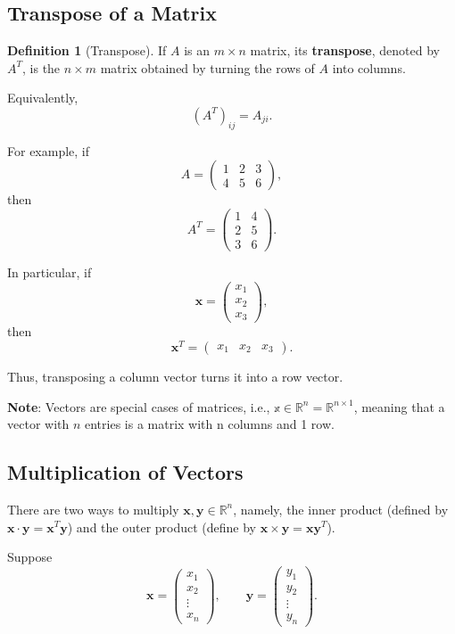 \documentclass[11pt]{article}
\theoremstyle{definition}
\newtheorem{definition}{Definition}
\theoremstyle{plain}
\theoremstyle{remark}
\begin{document}
\subsection*{Transpose of a Matrix}

\begin{definition}[Transpose]
If $A$ is an $m\times n$ matrix, its \textbf{transpose}, denoted by
$A^T$, is the $n\times m$ matrix obtained by turning the rows of $A$
into columns.

Equivalently,
\[
(A^T)_{ij}=A_{ji}.
\]
\end{definition}

For example, if
\[
A=
\begin{pmatrix}
1&2&3\\
4&5&6
\end{pmatrix},
\]
then
\[
A^T=
\begin{pmatrix}
1&4\\
2&5\\
3&6
\end{pmatrix}.
\]

In particular, if
\[
\mathbf{x}
=
\begin{pmatrix}
x_1\\
x_2\\
x_3
\end{pmatrix},
\]
then
\[
\mathbf{x}^T
=
\begin{pmatrix}
x_1&x_2&x_3
\end{pmatrix}.
\]

Thus, transposing a column vector turns it into a row vector.

\textbf{Note}: Vectors are special cases of matrices, i.e., $\mathbb{x}\in \mathbb{R}^n=\mathbb{R}^{n\times 1}$, meaning that a vector with $n$ entries is a matrix with n columns and 1 row.
\subsection*{Multiplication of Vectors}
There are two ways to multiply $\mathbf{x}, \mathbf{y}\in\mathbb{R}^n$, namely, the inner product (defined by $\mathbf{x}\cdot\mathbf{y}=\mathbf{x}^T\mathbf{y}$) and the outer product (define by $\mathbf{x}\times \mathbf{y} = \mathbf{x}\mathbf{y}^T$).

Suppose
\[
\mathbf{x}
=
\begin{pmatrix}
x_1\\
x_2\\
\vdots\\
x_n
\end{pmatrix},
\qquad
\mathbf{y}
=
\begin{pmatrix}
y_1\\
y_2\\
\vdots\\
y_n
\end{pmatrix}.
\]
\end{document}
